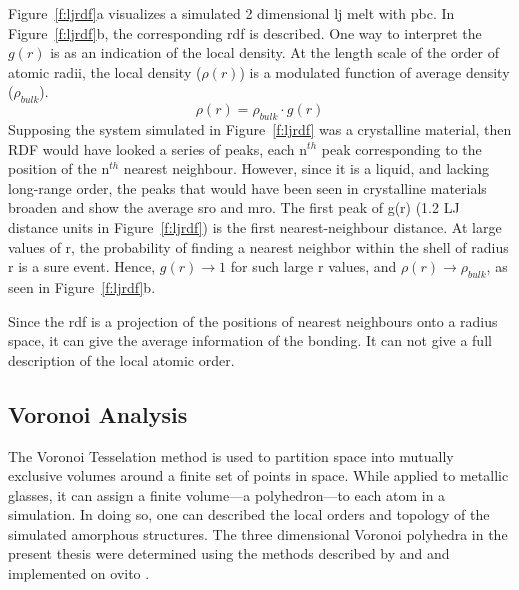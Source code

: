 Figure~\ref{f:ljrdf}a visualizes a simulated 2 dimensional \gls{lj} melt with \gls{pbc}. In Figure~\ref{f:ljrdf}b, the corresponding \gls{rdf} is described. One way to interpret the $g(r)$ is as an indication of the local density. At the length scale of the order of atomic radii, the local density ($\rho (r)$) is a modulated function of average density ($\rho_{bulk}$). \begin{equation} \rho (r) = \rho_{bulk} \cdot g(r) \end{equation}
Supposing the system simulated in Figure~\ref{f:ljrdf} was a crystalline material, then RDF would have looked a series of peaks, each n$^{th}$ peak corresponding to the position of the n$^{th}$ nearest neighbour. However, since it is a liquid, and lacking long-range order, the peaks that would have been seen in crystalline materials broaden and show the average \gls{sro} and \gls{mro}. The first peak of g(r) (1.2 LJ distance units in Figure~\ref{f:ljrdf}) is the first nearest-neighbour distance. At large values of r, the probability of finding a nearest neighbor within the shell of radius r is a sure event. Hence, $g(r)\rightarrow 1$ for such large r values, and $ \rho (r) \rightarrow \rho_{bulk} $, as seen in Figure~\ref{f:ljrdf}b. \par 

Since the \gls{rdf} is a projection of the positions of nearest neighbours onto a radius space, it can give the average information of the bonding. It can not give a full description of the local atomic order. \par




\subsection{Voronoi Analysis} \label{s:voronoi}
The Voronoi Tesselation method is used to partition space into mutually exclusive volumes around a finite set of points in space. While applied to metallic glasses, it can assign a finite volume---a polyhedron---to each atom in a simulation. In doing so, one can described the local orders and topology of the simulated amorphous structures. The three dimensional Voronoi polyhedra in the present thesis were determined using the methods described by \textcite{Brostow1978,Brostow1998} and \textcite{Borodin1999} and implemented on \gls{ovito} \cite{Stukowski2010a}. \par


